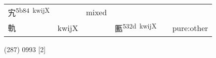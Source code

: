 \documentclass[14pt,a4paper]{scrartcl}
\begin{document}
\begin{longtable}[c]{@{}llllll@{}}
\begin{minipage}[t]{0.14\columnwidth}
宄\textsuperscript{5b84~kwijX}
\strut\end{minipage} &
\begin{minipage}[t]{0.14\columnwidth}\raggedright\strut
\strut\end{minipage} &
\begin{minipage}[t]{0.14\columnwidth}\raggedright\strut
mixed
\strut\end{minipage}\tabularnewline
\begin{minipage}[t]{0.14\columnwidth}\raggedright\strut
軌
\strut\end{minipage} &
\begin{minipage}[t]{0.14\columnwidth}\raggedright\strut
kwijX
\strut\end{minipage} &
\begin{minipage}[t]{0.14\columnwidth}\raggedright\strut
\strut\end{minipage} &
\begin{minipage}[t]{0.14\columnwidth}\raggedright\strut
匭\textsuperscript{532d~kwijX}
\strut\end{minipage} &
\begin{minipage}[t]{0.14\columnwidth}\raggedright\strut
\strut\end{minipage} &
\begin{minipage}[t]{0.14\columnwidth}\raggedright\strut
pure:other
\strut\end{minipage}\tabularnewline
\bottomrule
\end{longtable}

(287) 0993 {[}2{]}
\end{document}
